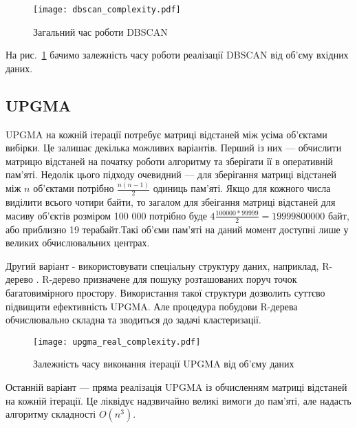                 \begin{figure}
                    \centering
                    \texttt{[image: dbscan\_complexity.pdf]}
                    \caption{Загальний час роботи DBSCAN}\label{fig:dbscan_complexity}
                \end{figure}
                
                На рис.~\ref{fig:dbscan_complexity} бачимо залежність часу роботи реалізації DBSCAN від об’єму вхідних даних.
                
            \subsection{UPGMA}
                UPGMA на кожній ітерації потребує матриці відстаней між усіма об’єктами вибірки. Це залишає декілька можливих варіантів. Перший із них --- обчислити матрицю відстаней на початку роботи алгоритму та зберігати її в оперативній пам’яті. Недолік цього підходу очевидний --- для зберігання матриці відстаней між $n$ об’єктами потрібно $\frac{n(n-1)}{2}$ одиниць пам’яті. Якщо для кожного числа виділити всього чотири байти, то загалом для збеігання матриці відстаней для масиву об’єктів розміром 100 000 потрібно буде $4\frac{100000*99999}{2} = 19999800000$ байт, або приблизно 19 терабайт.Такі об’єми пам’яті на даний момент доступні лише у великих обчислювальних центрах.
                
                Другий варіант - використовувати спеціальну структуру даних, наприклад, R-дерево \cite{Rtree}. R-дерево призначене для пошуку розташованих поруч точок багатовимірного простору. Використання такої структури дозволить суттєво підвищити ефективність UPGMA. Але процедура побудови R-дерева обчислювально складна та зводиться до задачі кластеризації.
                
                \begin{figure}
                    \centering
                    \texttt{[image: upgma\_real\_complexity.pdf]}
                    \caption{Залежність часу виконання ітерації UPGMA від об’єму даних}\label{fig:upgma_real_complexity}
                \end{figure}
                
                Останній варіант --- пряма реалізація UPGMA із обчисленням матриці відстаней на кожній ітерації. Це ліквідує надзвичайно великі вимоги до пам’яті, але надасть алгоритму складності $O(n^3)$. 
                
